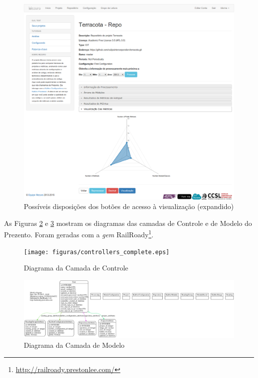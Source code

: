 \begin{figure}[!htb]
	\centering
    \includegraphics[keepaspectratio=true,scale=0.33]
    {figuras/exmplo_disposicao_botao_visualizacao_2.eps}
  \caption{Possíveis disposições dos botões de acesso à visualização (expandido)}
  \label{fig:exmplo_disposicao_botao_visualizacao_2}
\end{figure}

\newpage

As Figuras \ref{fig:controllers_complete} e \ref{fig:models_complete} mostram os
diagramas das camadas de Controle e de Modelo do Prezento. Foram geradas com a
\textit{gem} RailRoady\footnote{\url{http://railroady.prestonlee.com/}}.

\begin{figure}[!htb]
	\centering
    \texttt{[image: figuras/controllers\_complete.eps]}
  \caption{Diagrama da Camada de Controle}
  \label{fig:controllers_complete}
\end{figure}


\begin{figure}[!htb]
	\centering
    \includegraphics[keepaspectratio=true,scale=0.25]
    {figuras/models_complete.eps}
  \caption{Diagrama da Camada de Modelo}
  \label{fig:models_complete}
\end{figure}

